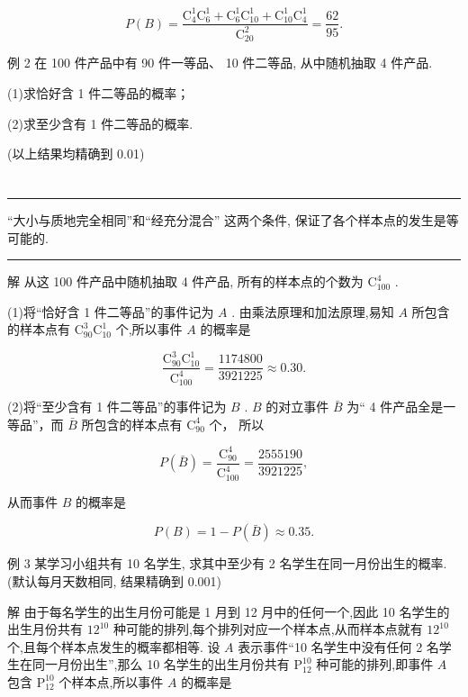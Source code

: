\documentclass[10pt]{article}
\newcommand{\HRule}{\begin{center}\rule{0.9\linewidth}{0.2mm}\end{center}}
\begin{document}
\[
P\left( B\right)  = \frac{{\mathrm{C}}_{4}^{1}{\mathrm{C}}_{6}^{1} + {\mathrm{C}}_{6}^{1}{\mathrm{C}}_{10}^{1} + {\mathrm{C}}_{10}^{1}{\mathrm{C}}_{4}^{1}}{{\mathrm{C}}_{20}^{2}} = \frac{62}{95}.
\]

例 2 在 100 件产品中有 90 件一等品、 10 件二等品, 从中随机抽取 4 件产品.

(1)求恰好含 1 件二等品的概率；

(2)求至少含有 1 件二等品的概率.

(以上结果均精确到 0.01)

\section*{}

\HRule

“大小与质地完全相同”和“经充分混合” 这两个条件, 保证了各个样本点的发生是等可能的.

\HRule

解 从这 100 件产品中随机抽取 4 件产品, 所有的样本点的个数为 \({\mathrm{C}}_{100}^{4}\) .

(1)将“恰好含 1 件二等品”的事件记为 \(A\) . 由乘法原理和加法原理,易知 \(A\) 所包含的样本点有 \({\mathrm{C}}_{90}^{3}{\mathrm{C}}_{10}^{1}\) 个,所以事件 \(A\) 的概率是

\[
\frac{{\mathrm{C}}_{90}^{3}{\mathrm{C}}_{10}^{1}}{{\mathrm{C}}_{100}^{4}} = \frac{1174800}{3921225} \approx  {0.30}.
\]

(2)将“至少含有 1 件二等品”的事件记为 \(B\) . \(B\) 的对立事件 \(\bar{B}\) 为“ 4 件产品全是一等品”，而 \(\bar{B}\) 所包含的样本点有 \({\mathrm{C}}_{90}^{4}\) 个， 所以

\[
P\left( \bar{B}\right)  = \frac{{\mathrm{C}}_{90}^{4}}{{\mathrm{C}}_{100}^{4}} = \frac{2555190}{3921225},
\]

从而事件 \(B\) 的概率是

\[
P\left( B\right)  = 1 - P\left( \bar{B}\right)  \approx  {0.35}.
\]

例 3 某学习小组共有 10 名学生, 求其中至少有 2 名学生在同一月份出生的概率. (默认每月天数相同, 结果精确到 0.001)

解 由于每名学生的出生月份可能是 1 月到 12 月中的任何一个,因此 10 名学生的出生月份共有 \({12}^{10}\) 种可能的排列,每个排列对应一个样本点,从而样本点就有 \({12}^{10}\) 个,且每个样本点发生的概率都相等. 设 \(A\) 表示事件“10 名学生中没有任何 2 名学生在同一月份出生”,那么 10 名学生的出生月份共有 \({\mathrm{P}}_{12}^{10}\) 种可能的排列,即事件 \(A\) 包含 \({\mathrm{P}}_{12}^{10}\) 个样本点,所以事件 \(A\) 的概率是
\end{document}
